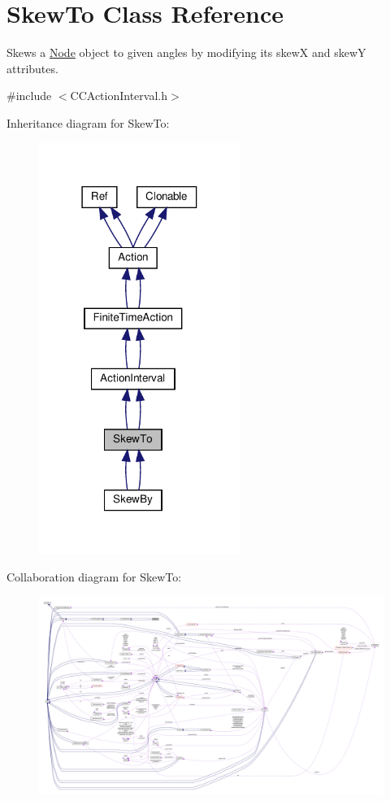 \hypertarget{classSkewTo}{}\section{Skew\+To Class Reference}
\label{classSkewTo}


Skews a \hyperlink{classNode}{Node} object to given angles by modifying it\textquotesingle{}s skewX and skewY attributes.  




{\ttfamily \#include $<$C\+C\+Action\+Interval.\+h$>$}



Inheritance diagram for Skew\+To\+:
\nopagebreak
\begin{figure}[H]
\begin{center}
\leavevmode
\includegraphics[width=186pt]{classSkewTo__inherit__graph}
\end{center}
\end{figure}


Collaboration diagram for Skew\+To\+:
\nopagebreak
\begin{figure}[H]
\begin{center}
\leavevmode
\includegraphics[width=350pt]{classSkewTo__coll__graph}
\end{center}
\end{figure}
